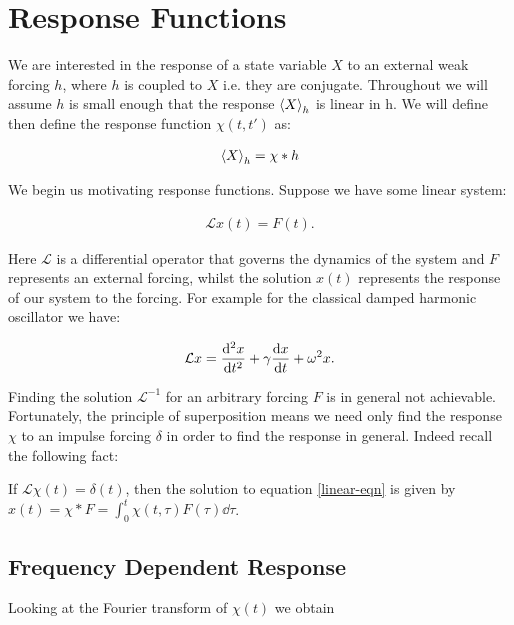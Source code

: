 
\section{Response Functions} \label{section: Response Functions}

We are interested in the response of a state variable $X$ to an external weak forcing $h$, where $h$ is coupled to $X$ i.e. they are conjugate. Throughout we will assume $h$ is small enough that the response $\expval{X}_h$ is linear in h. We will define then define the response function $\chi(t, t')$ as:

\begin{align}
\expval{X}_h = \chi * h
\end{align}

We begin us motivating response functions. Suppose we have some linear system: 

\begin{align}
\mathcal{L}x(t) = F(t). \label{linear-eqn}
\end{align}

Here $\mathcal{L}$ is a differential operator that governs the dynamics of the system and $F$ represents an external forcing, whilst the solution $x(t)$ represents the response of our system to the forcing. For example for the classical damped harmonic oscillator we have:

\begin{align*}
\mathcal{L} x = \dv[2]{x}{t} + \gamma \dv{x}{t} + \omega ^2 x.
\end{align*} 

\noindent Finding the solution $\mathcal{L}^{-1}$ for an arbitrary forcing $F$ is in general not achievable. Fortunately, the principle of superposition means we need only find the response $\chi$ to an impulse forcing $\delta$ in order to find the response in general. Indeed recall the following fact:

\begin{thm}
If $\mathcal{L}\chi(t) = \delta(t)$, then the solution to equation \ref{linear-eqn} is given by $x(t) = \chi * F = \int_0^t \chi(t, \tau) F(\tau) \dd \tau$.
\end{thm}


\subsection{Frequency Dependent Response}

Looking at the Fourier transform of $\chi(t)$ we obtain %
